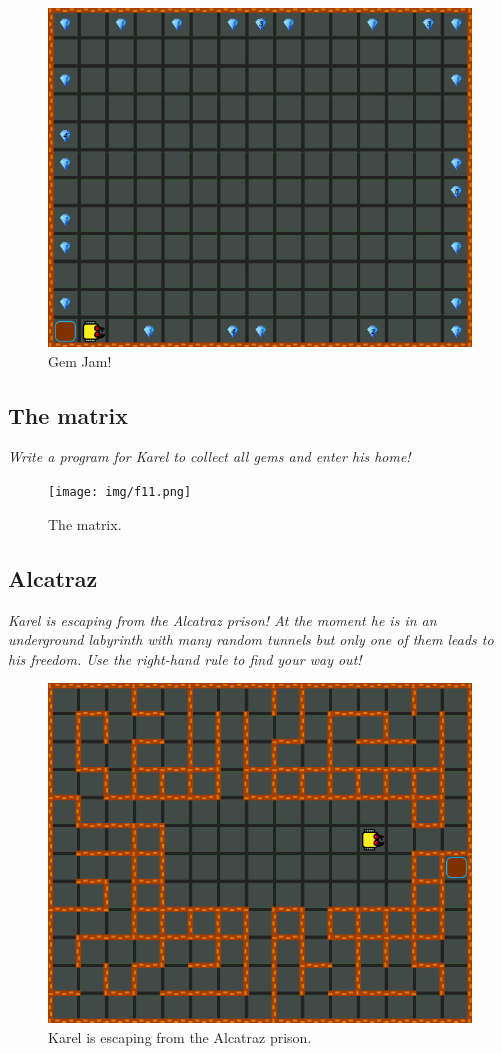 \begin{figure}[!ht]
\begin{center}
\includegraphics[height=0.4\textwidth]{img/f10.png}
\end{center}
\vspace{-4mm}
\caption{Gem Jam!}
\label{fig:f10}
\vspace{-1cm}
\end{figure}


\subsection{The matrix}

{\em Write a program for Karel to collect all gems and enter his home!}\\[-7mm]

\begin{figure}[!ht]
\begin{center}
\texttt{[image: img/f11.png]}
\end{center}
\vspace{-4mm}
\caption{The matrix.}
\label{fig:f11}
\end{figure}
\vspace{-1cm}
\newpage



\subsection{Alcatraz}

{\em Karel is escaping from the Alcatraz prison! At the moment he is in an underground labyrinth with many random tunnels but only one of them leads to his freedom. Use the right-hand rule to find your way out!}


\begin{figure}[!ht]
\begin{center}
\includegraphics[height=0.4\textwidth]{img/f12.png}
\end{center}
\vspace{-4mm}
\caption{Karel is escaping from the Alcatraz prison.}
\label{fig:f12}
\vspace{-1cm}
\end{figure}


